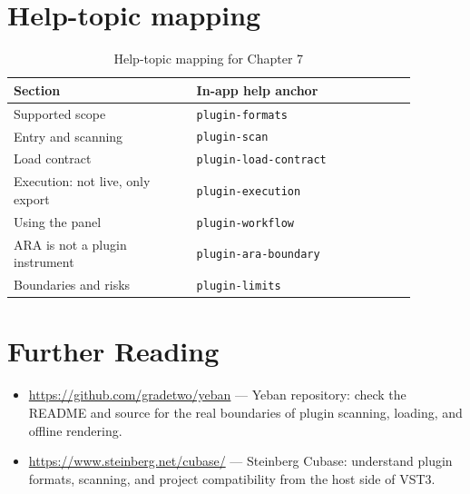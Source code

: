 \section{Help-topic mapping}

\begin{table}[htbp]
\centering
\small
\begin{tabular}{@{}p{0.40\linewidth}p{0.48\linewidth}@{}}
\hline
Section & In-app help anchor \\
\hline
Supported scope & \texttt{plugin-formats} \\
Entry and scanning & \texttt{plugin-scan} \\
Load contract & \texttt{plugin-load-contract} \\
Execution: not live, only export & \texttt{plugin-execution} \\
Using the panel & \texttt{plugin-workflow} \\
ARA is not a plugin instrument & \texttt{plugin-ara-boundary} \\
Boundaries and risks & \texttt{plugin-limits} \\
\hline
\end{tabular}
\caption{Help-topic mapping for Chapter 7}
\end{table}

\section*{Further Reading}
\begin{itemize}[leftmargin=1.5em]
\item \url{https://github.com/gradetwo/yeban} — Yeban repository: check the README and source for the real boundaries of plugin scanning, loading, and offline rendering.
\item \url{https://www.steinberg.net/cubase/} — Steinberg Cubase: understand plugin formats, scanning, and project compatibility from the host side of VST3.
\end{itemize}
